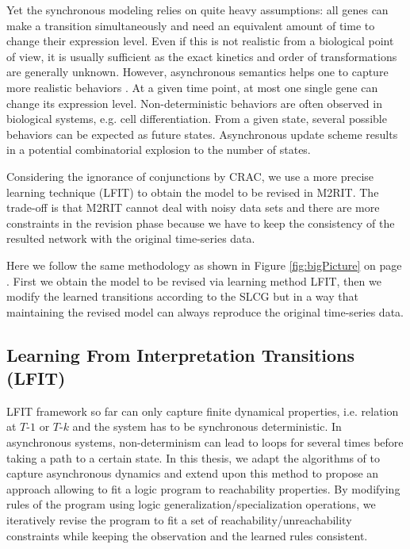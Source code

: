 Yet the synchronous modeling relies on quite heavy assumptions:
all genes can make a transition simultaneously and need an equivalent amount of time to change their expression level.
Even if this is not realistic from a biological point of view, it is usually sufficient as the exact kinetics and order of transformations are generally unknown.
However, asynchronous semantics helps one to capture more realistic behaviors \cite{bernot2009}.
At a given time point, at most one single gene can change its expression level.
Non-deterministic behaviors are often observed in biological systems, e.g. cell differentiation.
From a given state, several possible behaviors can be expected as future states.
Asynchronous update scheme results in a potential combinatorial explosion to the number of states.

Considering the ignorance of conjunctions by CRAC, we use a more precise learning technique (LFIT) to obtain the model to be revised in M2RIT.
The trade-off is that M2RIT cannot deal with noisy data sets and there are more constraints in the revision phase because we have to keep the consistency of the resulted network with the original time-series data.

Here we follow the same methodology as shown in Figure \ref{fig:bigPicture} on page \pageref{fig:bigPicture}.
First we obtain the model to be revised via learning method LFIT, then we modify the learned transitions according to the SLCG but in a way that maintaining the revised model can always reproduce the original time-series data.

\subsection{Learning From Interpretation Transitions (LFIT)}\label{sec:lfit}
LFIT framework so far can only capture finite dynamical properties, i.e. relation at $T$-$1$ or $T$-$k$ and the system has to be synchronous deterministic.
In asynchronous systems, non-determinism can lead to loops for several times before taking a path to a certain state.
In this thesis, we adapt the algorithms of \cite{ribeiro2015learning,DMTRICLP15} to capture asynchronous dynamics and extend upon this method to propose an approach allowing to fit a logic program to reachability properties.
By modifying rules of the program using logic generalization/specialization operations, we iteratively revise the program to fit a set of reachability/unreachability constraints while keeping the observation and the learned rules consistent.

